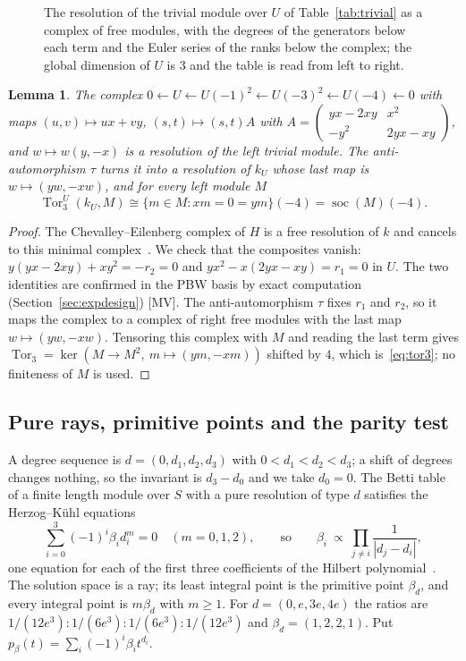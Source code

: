 \documentclass[11pt]{article}
\newtheorem{lemma}{Lemma}
\theoremstyle{definition}
\theoremstyle{remark}
\newcommand{\Tor}{\operatorname{Tor}}
\begin{document}
\begin{figure}[htbp]
\centering

\caption{The resolution of the trivial module over $U$ of Table~\ref{tab:trivial} as a complex of free modules, with the degrees of the generators below each term and the Euler series of the ranks below the complex; the global dimension of $U$ is $3$ and the table is read from left to right.}
\label{fig:resolution}
\end{figure}

\begin{lemma}\label{lem:trivial}
The complex $0\leftarrow U\leftarrow U(-1)^2\leftarrow U(-3)^2\leftarrow U(-4)\leftarrow0$ with maps $(u,v)\mapsto ux+vy$, $(s,t)\mapsto(s,t)A$ with $A=\begin{pmatrix}yx-2xy&x^2\\-y^2&2yx-xy\end{pmatrix}$, and $w\mapsto w(y,-x)$ is a resolution of the left trivial module. The anti-automorphism $\tau$ turns it into a resolution of $k_U$ whose last map is $w\mapsto(yw,-xw)$, and for every left module $M$
\begin{equation}\label{eq:tor3}
\Tor_3^U(k_U,M)\cong\{m\in M: xm=0=ym\}(-4)=\operatorname{soc}(M)(-4).
\end{equation}
\end{lemma}
\begin{proof}
The Chevalley--Eilenberg complex of $H$ is a free resolution of $k$ and cancels to this minimal complex~\cite[Section~6]{ES16}. We check that the composites vanish: $y(yx-2xy)+xy^2=-r_2=0$ and $yx^2-x(2yx-xy)=r_1=0$ in $U$. The two identities are confirmed in the PBW basis by exact computation (Section~\ref{sec:expdesign}) [MV]. The anti-automorphism $\tau$ fixes $r_1$ and $r_2$, so it maps the complex to a complex of right free modules with the last map $w\mapsto(yw,-xw)$. Tensoring this complex with $M$ and reading the last term gives $\Tor_3=\ker(M\to M^2,\ m\mapsto(ym,-xm))$ shifted by $4$, which is~\eqref{eq:tor3}; no finiteness of $M$ is used.
\end{proof}

\subsection{Pure rays, primitive points and the parity test}
\label{sec:parity}

A degree sequence is $d=(0,d_1,d_2,d_3)$ with $0<d_1<d_2<d_3$; a shift of degrees changes nothing, so the invariant is $d_3-d_0$ and we take $d_0=0$. The Betti table of a finite length module over $S$ with a pure resolution of type $d$ satisfies the Herzog--K\"uhl equations
\begin{equation}\label{eq:HK}
\sum_{i=0}^{3}(-1)^i\beta_id_i^m=0\quad(m=0,1,2),\qquad\text{so}\qquad \beta_i\ \propto\ \prod_{j\ne i}\frac1{|d_j-d_i|},
\end{equation}
one equation for each of the first three coefficients of the Hilbert polynomial~\cite{HK84,ES09}. The solution space is a ray; its least integral point is the primitive point $\beta_d$, and every integral point is $m\beta_d$ with $m\ge1$. For $d=(0,e,3e,4e)$ the ratios are $1/(12e^3):1/(6e^3):1/(6e^3):1/(12e^3)$ and $\beta_d=(1,2,2,1)$. Put $p_\beta(t)=\sum_i(-1)^i\beta_it^{d_i}$.
\end{document}
